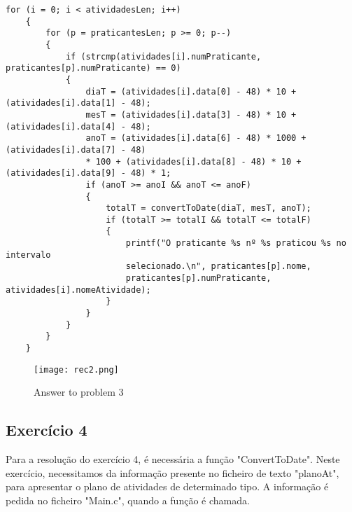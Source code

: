 \begin{lstlisting}[caption=Exemplo exercício 3]
for (i = 0; i < atividadesLen; i++)
    {
        for (p = praticantesLen; p >= 0; p--)
        {
            if (strcmp(atividades[i].numPraticante, praticantes[p].numPraticante) == 0)
            {
                diaT = (atividades[i].data[0] - 48) * 10 + (atividades[i].data[1] - 48);
                mesT = (atividades[i].data[3] - 48) * 10 + (atividades[i].data[4] - 48);
                anoT = (atividades[i].data[6] - 48) * 1000 + (atividades[i].data[7] - 48) 
                * 100 + (atividades[i].data[8] - 48) * 10 + (atividades[i].data[9] - 48) * 1;
                if (anoT >= anoI && anoT <= anoF)
                {
                    totalT = convertToDate(diaT, mesT, anoT);
                    if (totalT >= totalI && totalT <= totalF)
                    {
                        printf("O praticante %s nº %s praticou %s no intervalo 
                        selecionado.\n", praticantes[p].nome, 
                        praticantes[p].numPraticante, atividades[i].nomeAtividade);
                    }
                }
            }
        }
    }
\end{lstlisting}

\begin{figure}[htbp]
\centering
\texttt{[image: rec2.png]}  %
\caption{Answer to problem 3}
\label{fig:ex3}
\end{figure}

\subsection{Exercício 4}
Para a resolução do exercício 4, é necessária a função "ConvertToDate". Neste exercício, necessitamos da informação presente no ficheiro de texto "planoAt", para apresentar o plano de atividades de determinado tipo.
A informação é pedida no ficheiro "Main.c", quando a função é chamada.

